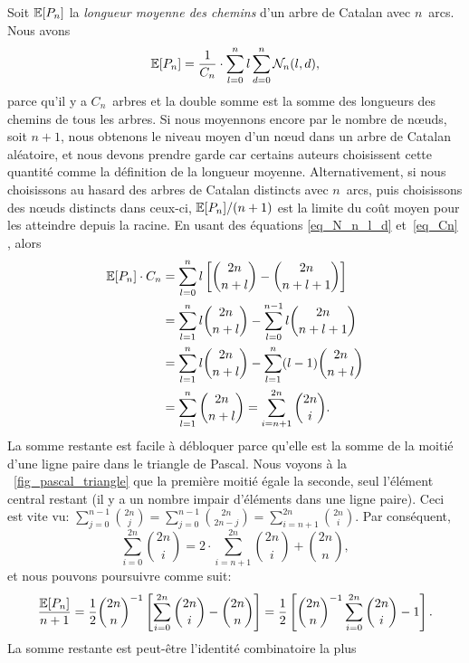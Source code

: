 Soit \(\mathbb{E}[{P_n}]\) la \emph{longueur moyenne des chemins} d'un
arbre de Catalan avec \(n\)~arcs. Nous avons
\begin{equation*}
  \mathbb{E}[{P_n}] = \frac{1}{C_{n}} \cdot \sum_{l=0}^{n}l\sum_{d=0}^{n}\mathcal{N}_n(l,d),
\end{equation*}
parce qu'il y a \(C_n\)~arbres et la double somme est la somme des
longueurs des chemins de tous les arbres. Si nous moyennons encore par
le nombre de n{\oe}uds, soit \(n+1\), nous obtenons le niveau moyen
d'un n{\oe}ud dans un arbre de Catalan aléatoire, et nous devons
prendre garde car certains auteurs choisissent cette quantité comme la
définition de la longueur moyenne. Alternativement, si nous
choisissons au hasard des arbres de Catalan distincts avec \(n\)~arcs,
puis choisissons des n{\oe}uds distincts dans ceux-ci,
\(\mathbb{E}[{P_n}]/(n+1)\) est la limite du coût moyen pour les
atteindre depuis la racine. En usant des équations \eqref{eq_N_n_l_d}
et~\eqref{eq_Cn} , alors
\begin{align*}
\mathbb{E}[{P_n}] \cdot C_n
 &= \sum_{l=0}^{n}l\left[\binom{2n}{n+l} - \binom{2n}{n+l+1}\right]\\
 &= \sum_{l=1}^{n}l \binom{2n}{n+l} - \sum_{l=0}^{n-1}l \binom{2n}{n+l+1}\\
 &= \sum_{l=1}^{n}l \binom{2n}{n+l} - \sum_{l=1}^{n}(l-1)\binom{2n}{n+l}\\
 &= \sum_{l=1}^{n}\binom{2n}{n+l}
  = \sum_{i=n+1}^{2n}\binom{2n}{i}.
\end{align*}
La somme restante est facile à débloquer parce qu'elle est la somme de
la moitié d'une ligne paire dans le triangle de Pascal. Nous voyons à
la \fig~\vref{fig_pascal_triangle} que la première moitié égale la
seconde, seul l'élément central restant (il y a un nombre impair
d'éléments dans une ligne paire). Ceci est vite vu:
\(\sum_{j=0}^{n-1}\binom{2n}{j} = \sum_{j=0}^{n-1}\binom{2n}{2n-j} =
\sum_{i=n+1}^{2n}\binom{2n}{i}\). Par conséquent,
\begin{equation*}
\sum_{i=0}^{2n}\binom{2n}{i} = 2 \cdot \!\! \sum_{i=n+1}^{2n}\binom{2n}{i}
+ \binom{2n}{n},
\end{equation*}
et nous pouvons poursuivre comme suit:
\begin{equation*}
\frac{\mathbb{E}[{P_n}]}{n+1}
  = \frac{1}{2}\binom{2n}{n}^{-1}\left[\sum_{i=0}^{2n}\binom{2n}{i} -
    \binom{2n}{n}\right]
  = \frac{1}{2}\left[\binom{2n}{n}^{-1}\sum_{i=0}^{2n}\binom{2n}{i} - 1\right].
\end{equation*}
La somme restante est peut-être l'identité combinatoire la plus

